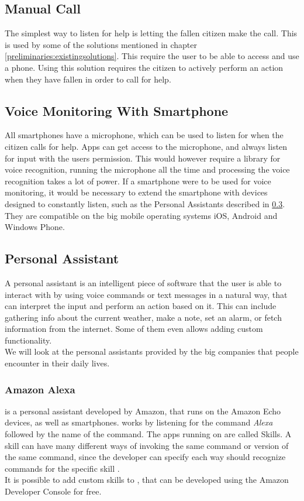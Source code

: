 \subsection{Manual Call}
The simplest way to listen for help is letting the fallen citizen make the call. This is used by some of the solutions mentioned in chapter \ref{preliminaries:existingsolutions}. This require the user to be able to access and use a phone. Using this solution requires the citizen to actively perform an action when they have fallen in order to call for help.

\subsection{Voice Monitoring With Smartphone}
All smartphones have a microphone, which can be used to listen for when the citizen calls for help. Apps can get access to the microphone, and always listen for input with the users permission. This would however require a library for voice recognition, running the microphone all the time and processing the voice recognition takes a lot of power. If a smartphone were to be used for voice monitoring, it would be necessary to extend the smartphone with devices designed to constantly listen, such as the Personal Assistants described in \ref{preliminaries:systeminteraction:personalassistant}. They are compatible on the big mobile operating systems iOS, Android and Windows Phone.

\subsection{Personal Assistant}\label{preliminaries:systeminteraction:personalassistant}
A personal assistant is an intelligent piece of software that the user is able to interact with by using voice commands or text messages in a natural way, that can interpret the input and perform an action based on it. This can include gathering info about the current weather, make a note, set an alarm, or fetch information from the internet. Some of them even allows adding custom functionality.\\
We will look at the personal assistants provided by the big companies that people encounter in their daily lives.

\subsubsection{Amazon Alexa}
\alexa is a personal assistant developed by Amazon, that runs on the Amazon Echo devices, as well as smartphones. \alexa works by listening for the command \textit{Alexa} followed by the name of the command. The apps running on \alexa are called Skills. A skill can have many different ways of invoking the same command or version of the same command, since the developer can specify each way \alexa should recognize commands for the specific skill \cite{AmazonAlexa, AmazonAlexa:UnderstandingCustomSkills}.\\
It is possible to add custom skills to \alexa, that can be developed using the Amazon Developer Console for free.

